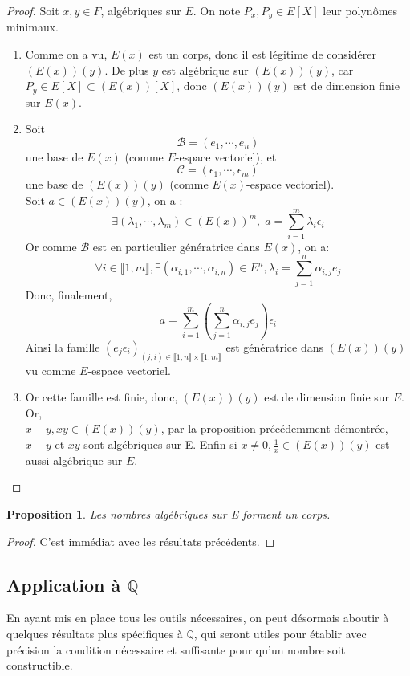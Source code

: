 \documentclass[a4paper,12pt,french]{report}
\newtheorem{proposition}{Proposition}[section]
\begin{document}
		\begin{proof}
			Soit \(x,y \in F\), algébriques sur $E$. On note \(P_{x},P_{y} \in E[X]\) leur polynômes minimaux.
			\begin{enumerate}
				\item
				    Comme on a vu, $E(x)$ est un corps, donc il est légitime de considérer $(E(x))(y)$.
				    De plus $y$ est algébrique sur $(E(x))(y)$, car \(P_{y} \in E[X] \subset (E(x))[X]\), donc $(E(x))(y)$ est de dimension finie sur $E(x)$.
				\item 
				    Soit \[\mathcal{B} = (e_{1}, \cdots, e_{n}) \] une base de $E(x)$ (comme $E$-espace vectoriel), et \[\mathcal{C} = (\epsilon_{1},\cdots, \epsilon_{m})\] une base de $(E(x))(y)$ (comme $E(x)$-espace vectoriel).\\
				    Soit \(a \in (E(x))(y) \), on a : \[\exists (\lambda_{1},\cdots,\lambda_{m}) \in (E(x))^{m}, \; a = \sum_{i=1}^{m}\lambda_{i}\epsilon_{i}\]
				    Or comme $\mathcal{B}$ est en particulier génératrice dans $E(x)$, on a:
				    \[\forall i \in \llbracket 1 , m \rrbracket, \exists (\alpha_{i,1},\cdots,\alpha_{i,n}) \in E^{n}, \lambda_{i} = \sum_{j=1}^{n}\alpha_{i,j}e_{j} \]
				    Donc, finalement, 
				    \[a = \sum_{i=1}^{m} \left(  \sum_{j=1}^{n}\alpha_{i,j}e_{j} \right)\epsilon_{i} \]
				    Ainsi la famille \((e_{j}\epsilon_{i})_{(j,i) \in \llbracket 1 , n \rrbracket \times \llbracket 1 , m \rrbracket} \) est génératrice dans $(E(x))(y)$ vu comme {$E$-espace vectoriel}.
				\item{}
				    Or cette famille est finie, donc, $(E(x))(y)$ est de dimension finie sur $E$.  Or, \\\({x+y,xy \in (E(x))(y)}\), par la proposition précédemment démontrée, $x+y$ et $xy$ sont algébriques sur E. Enfin si $x \neq 0, \frac{1}{x} \in (E(x))(y)$ est aussi algébrique sur $E$.
			\end{enumerate}
		\end{proof}
		
		
		\begin{proposition}
			Les nombres algébriques sur E forment un corps.
		\end{proposition}
		\begin{proof}
		    C'est immédiat avec les résultats précédents.
		\end{proof}
	
		\subsection{Application à $\mathbb{Q}$}
	En ayant mis en place tous les outils nécessaires, on peut désormais aboutir à quelques résultats plus spécifiques à $\mathbb{Q}$, qui seront utiles pour établir avec précision la condition nécessaire et suffisante pour qu'un nombre soit constructible.
		
\end{document}
